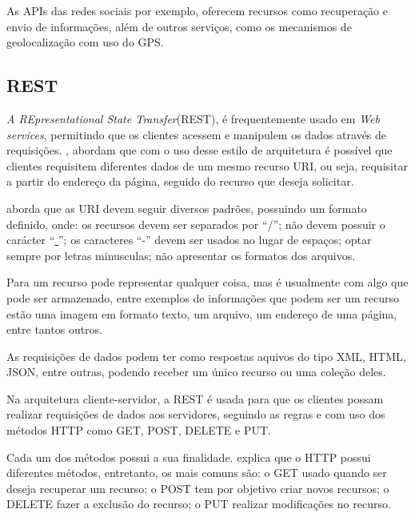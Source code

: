As APIs das redes sociais por exemplo, oferecem recursos como recuperação e envio de informações, além de outros serviços, como os mecanismos de geolocalização com uso do GPS.

\subsection{REST}
\textit{A REpresentational State Transfer}(REST), é frequentemente usado em \textit{Web services}, permitindo que os clientes acessem e manipulem os dados através de requisições. \citet{zhou2014}, abordam que com o uso desse estilo de arquitetura é possível que clientes requisitem diferentes dados de um mesmo recurso URI, ou seja, requisitar a partir do endereço da página, seguido do recurso que deseja solicitar.

\cite{makice2009} aborda que as URI devem seguir diversos padrões, possuindo um formato definido, onde: os recursos devem ser separados por ``/''; não devem possuir o carácter ``\underline{{ }}''; os caracteres ``-'' devem ser usados no lugar de espaços; optar sempre por letras minusculas; não apresentar os formatos dos arquivos.

Para \cite{leonard2013} um recurso pode representar qualquer coisa, mas é usualmente com algo que pode ser armazenado, entre exemplos de informações que podem ser um recurso estão uma imagem em formato texto, um arquivo, um endereço de uma página, entre tantos outros.


As requisições de dados podem ter como respostas aquivos do tipo XML, HTML, JSON, entre outras, podendo receber um único recurso ou uma coleção deles.

Na arquitetura cliente-servidor, a REST é usada para que os clientes possam realizar requisições de dados aos servidores, seguindo as regras e com uso dos métodos HTTP como GET, POST, DELETE e PUT.

Cada um dos métodos possui a sua finalidade. \cite{leonard2013} explica que o HTTP possui diferentes métodos, entretanto, os mais comuns são: o GET usado quando ser deseja recuperar um recurso; o POST tem por objetivo criar novos recursos; o DELETE fazer a exclusão do recurso; o PUT realizar modificações no recurso.

